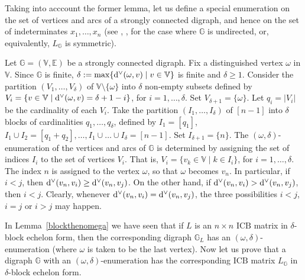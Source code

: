 \documentclass[ALCO]{cedram}
\newcommand{\mbg}{\mbox{$\mathbb{G}$}}
\newcommand{\mbv}{\mbox{$\mathbb{V}$}}
\newcommand{\mbe}{\mbox{$\mathbb{E}$}}
\newcommand{\icb}{\mbox{$\mathrm{ICB}$}}
\newcommand{\ud}{\mbox{${\rm d}^\vee$}}
\begin{document}
 Taking into acccount the former lemma, let us define a
special enumeration on the set of vertices and arcs of a strongly
connected digraph, and hence on the set of indeterminates $x_1,\ldots
,x_n$ (see \cite[p.~7]{crs}, \cite[Section~2.2.3]{mos}, for the case
where $\mbg$ is undirected, or, equivalently, $L_{\mathbb{G}}$ is
symmetric).

\begin{definition}\label{def-omega}
Let $\mbg=(\mbv,\mbe)$ be a strongly connected digraph.  Fix a
distinguished vertex $\omega$ in $\mbv$. Since $\mbg$ is finite,
$\delta:=\max\{\ud(\omega,v)\mid v\in \mbv\}$ is finite and
$\delta\geq 1$. Consider the partition $(V_1,\ldots ,V_{\delta})$ of
$\mbv\setminus\{\omega\}$ into $\delta$ non-empty subsets defined by
$V_i=\{v\in \mbv\mid \ud(\omega,v)=\delta+1-i\}$, for $i=1,\ldots
,\delta$. Set $V_{\delta+1}=\{\omega\}$.  Let $q_i=\lvert V_i\rvert$
be the cardinality of each $V_i$. Take the partition $(I_1,\ldots
,I_\delta)$ of $[n-1]$ into $\delta$ blocks of cardinalities
$q_1,\ldots ,q_\delta$, defined by $I_1=[q_1]$, $I_1\cup
I_2=[q_1+q_2],\ldots ,I_1\cup\ldots\cup I_\delta=[n-1]$. Set
$I_{\delta+1}=\{n\}$. The $(\omega,\delta)$-enumeration of the
vertices and arcs of $\mbg$ is determined by assigning the set of
indices $I_i$ to the set of vertices $V_i$.  That is, $V_i=\{v_k\in
\mbv\mid k\in I_i\}$, for $i=1,\ldots ,\delta$. The index $n$ is
assigned to the vertex $\omega$, so that $\omega$ becomes $v_n$. In
particular, if $i<j$, then $\ud(v_n,v_i)\geq \ud(v_n,v_j)$. On the
other hand, if $\ud(v_n,v_i)>\ud(v_n,v_j)$, then $i<j$. Clearly,
whenever $\ud(v_n,v_i)=\ud(v_n,v_j)$, the three possibilities $i<j$,
$i=j$ or $i>j$ may happen.
\end{definition}

In Lemma~\ref{blockthenomega} we have seen that if $L$ is an $n\times
n$ $\icb$ matrix in $\delta$-block echelon form, then the
corresponding digraph $\mbg_L$ has an $(\omega,\delta)$-enumeration
(where $\omega$ is taken to be the last vertex). Now let us prove that
a digraph $\mbg$ with an $(\omega,\delta)$-enumeration has the
corresponding $\icb$ matrix $L_{\mathbb{G}}$ in $\delta$-block echelon
form.
\end{document}
